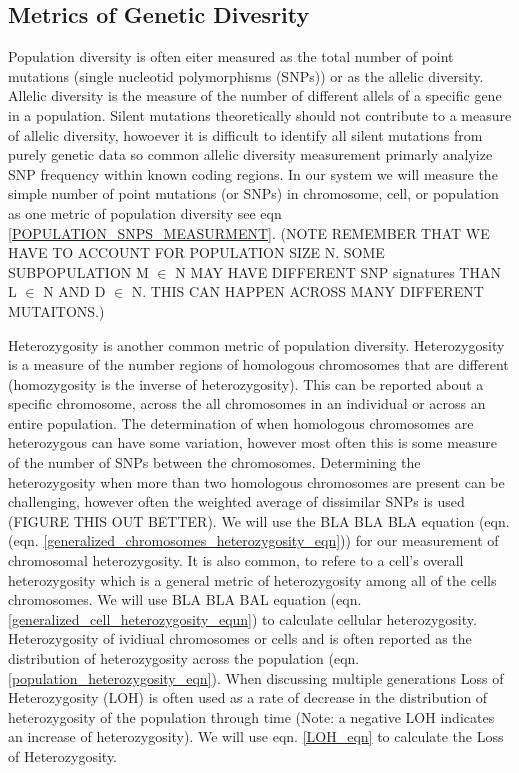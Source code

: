\documentclass{article}
\begin{document}
    \subsection{Metrics of Genetic Divesrity}
    Population diversity is often eiter measured as the total number of point mutations (single nucleotid polymorphisms (SNPs)) or as the allelic diversity.  Allelic diversity is the measure of the number of different allels of a specific gene in a population. Silent mutations theoretically should not contribute to a measure of allelic diversity, howoever it is difficult to identify all silent mutations from purely genetic data so common allelic diversity measurement primarly analyize SNP frequency within known coding regions.  In our system we will measure the simple number of point mutations (or SNPs) in chromosome, cell, or population as one metric of population diversity see eqn \ref{POPULATION_SNPS_MEASURMENT}.  (NOTE REMEMBER THAT WE HAVE TO ACCOUNT FOR POPULATION SIZE N.  SOME SUBPOPULATION M \(\in\) N MAY HAVE DIFFERENT SNP signatures THAN L \(\in\)  N AND D \(\in\)  N.  THIS CAN HAPPEN ACROSS MANY DIFFERENT MUTAITONS.)
    

    Heterozygosity is another common metric of population diversity.  Heterozygosity is a measure of the number regions of homologous chromosomes that are different (homozygosity is the inverse of heterozygosity).  This can be reported about a specific chromosome, across the all chromosomes in an individual or across an entire population.  The determination of when homologous chromosomes are heterozygous can have some variation, however most often this is some measure of the number of SNPs between the chromosomes.  Determining the heterozygosity when more than two homologous chromosomes are present can be challenging, however often the weighted average of dissimilar SNPs is used (FIGURE THIS OUT BETTER).  We will use the BLA BLA BLA equation (eqn. (eqn. \ref{generalized_chromosomes_heterozygosity_eqn})) for our measurement of chromosomal heterozygosity.  It is also common, to refere to a cell's overall heterozygosity which is a general metric of heterozygosity among all of the cells chromosomes.  We will use BLA BLA BAL equation (eqn. \ref{generalized_cell_heterozygosity_equn}) to calculate cellular heterozygosity.  Heterozygosity of ividiual chromosomes or cells and is often reported as the distribution of heterozygosity across the population (eqn. \ref{population_heterozygosity_eqn}).  When discussing multiple generations Loss of Heterozygosity (LOH) is often used as a rate of decrease in the distribution of heterozygosity of the population through time (Note: a negative LOH indicates an increase of heterozygosity). We will use eqn. \ref{LOH_eqn} to calculate the Loss of Heterozygosity.
\end{document}
